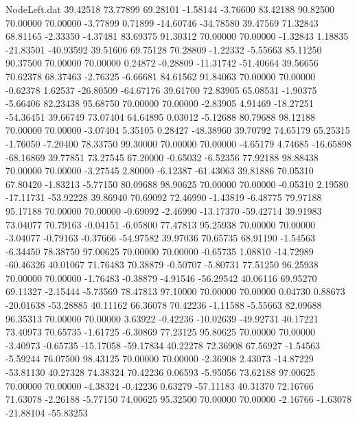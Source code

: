 \begin{filecontents}{NodeLeft.dat}
  39.42518   73.77899   69.28101    -1.58144   -3.76600   83.42188   90.82500   70.00000   70.00000   -3.77899    0.71899  -14.60746  -34.78580
  39.47569   71.32843   68.81165    -2.33350   -4.37481   83.69375   91.30312   70.00000   70.00000   -1.32843    1.18835  -21.83501  -40.93592
  39.51606   69.75128   70.28809    -1.22332   -5.55663   85.11250   90.37500   70.00000   70.00000    0.24872   -0.28809  -11.31742  -51.40664
  39.56656   70.62378   68.37463    -2.76325   -6.66681   84.61562   91.84063   70.00000   70.00000   -0.62378    1.62537  -26.80509  -64.67176
  39.61700   72.83905   65.08531    -1.90375   -5.66406   82.23438   95.68750   70.00000   70.00000   -2.83905    4.91469  -18.27251  -54.36451
  39.66749   73.07404   64.64895     0.03012   -5.12688   80.79688   98.12188   70.00000   70.00000   -3.07404    5.35105    0.28427  -48.38960
  39.70792   74.65179   65.25315    -1.76050   -7.20400   78.33750   99.30000   70.00000   70.00000   -4.65179    4.74685  -16.65898  -68.16869
  39.77851   73.27545   67.20000    -0.65032   -6.52356   77.92188   98.88438   70.00000   70.00000   -3.27545    2.80000   -6.12387  -61.43063
  39.81886   70.05310   67.80420    -1.83213   -5.77150   80.09688   98.90625   70.00000   70.00000   -0.05310    2.19580  -17.11731  -53.92228
  39.86940   70.69092   72.46990    -1.43819   -6.48775   79.97188   95.17188   70.00000   70.00000   -0.69092   -2.46990  -13.17370  -59.42714
  39.91983   73.04077   70.79163    -0.04151   -6.05800   77.47813   95.25938   70.00000   70.00000   -3.04077   -0.79163   -0.37666  -54.97582
  39.97036   70.65735   68.91190    -1.54563   -6.34450   78.38750   97.00625   70.00000   70.00000   -0.65735    1.08810  -14.72989  -60.46326
  40.01067   71.76483   70.38879    -0.50707   -5.80731   77.51250   96.25938   70.00000   70.00000   -1.76483   -0.38879   -4.91546  -56.29542
  40.06116   69.95270   69.11327    -2.15444   -5.73569   78.47813   97.10000   70.00000   70.00000    0.04730    0.88673  -20.01638  -53.28885
  40.11162   66.36078   70.42236    -1.11588   -5.55663   82.09688   96.35313   70.00000   70.00000    3.63922   -0.42236  -10.02639  -49.92731
  40.17221   73.40973   70.65735    -1.61725   -6.30869   77.23125   95.80625   70.00000   70.00000   -3.40973   -0.65735  -15.17058  -59.17834
  40.22278   72.36908   67.56927    -1.54563   -5.59244   76.07500   98.43125   70.00000   70.00000   -2.36908    2.43073  -14.87229  -53.81130
  40.27328   74.38324   70.42236     0.06593   -5.95056   73.62188   97.00625   70.00000   70.00000   -4.38324   -0.42236    0.63279  -57.11183
  40.31370   72.16766   71.63078    -2.26188   -5.77150   74.00625   95.32500   70.00000   70.00000   -2.16766   -1.63078  -21.88104  -55.83253

\end{filecontents}
